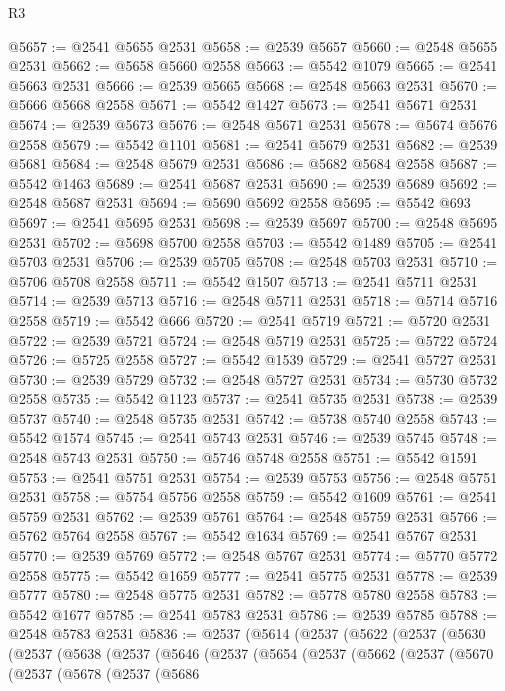 \begin{lexlean}{R3}
\begin{coremodule}
@5657 := @2541 @5655 @2531
@5658 := @2539 @5657
@5660 := @2548 @5655 @2531
@5662 := @5658 @5660 @2558
@5663 := @5542 @1079
@5665 := @2541 @5663 @2531
@5666 := @2539 @5665
@5668 := @2548 @5663 @2531
@5670 := @5666 @5668 @2558
@5671 := @5542 @1427
@5673 := @2541 @5671 @2531
@5674 := @2539 @5673
@5676 := @2548 @5671 @2531
@5678 := @5674 @5676 @2558
@5679 := @5542 @1101
@5681 := @2541 @5679 @2531
@5682 := @2539 @5681
@5684 := @2548 @5679 @2531
@5686 := @5682 @5684 @2558
@5687 := @5542 @1463
@5689 := @2541 @5687 @2531
@5690 := @2539 @5689
@5692 := @2548 @5687 @2531
@5694 := @5690 @5692 @2558
@5695 := @5542 @693
@5697 := @2541 @5695 @2531
@5698 := @2539 @5697
@5700 := @2548 @5695 @2531
@5702 := @5698 @5700 @2558
@5703 := @5542 @1489
@5705 := @2541 @5703 @2531
@5706 := @2539 @5705
@5708 := @2548 @5703 @2531
@5710 := @5706 @5708 @2558
@5711 := @5542 @1507
@5713 := @2541 @5711 @2531
@5714 := @2539 @5713
@5716 := @2548 @5711 @2531
@5718 := @5714 @5716 @2558
@5719 := @5542 @666
@5720 := @2541 @5719
@5721 := @5720 @2531
@5722 := @2539 @5721
@5724 := @2548 @5719 @2531
@5725 := @5722 @5724
@5726 := @5725 @2558
@5727 := @5542 @1539
@5729 := @2541 @5727 @2531
@5730 := @2539 @5729
@5732 := @2548 @5727 @2531
@5734 := @5730 @5732 @2558
@5735 := @5542 @1123
@5737 := @2541 @5735 @2531
@5738 := @2539 @5737
@5740 := @2548 @5735 @2531
@5742 := @5738 @5740 @2558
@5743 := @5542 @1574
@5745 := @2541 @5743 @2531
@5746 := @2539 @5745
@5748 := @2548 @5743 @2531
@5750 := @5746 @5748 @2558
@5751 := @5542 @1591
@5753 := @2541 @5751 @2531
@5754 := @2539 @5753
@5756 := @2548 @5751 @2531
@5758 := @5754 @5756 @2558
@5759 := @5542 @1609
@5761 := @2541 @5759 @2531
@5762 := @2539 @5761
@5764 := @2548 @5759 @2531
@5766 := @5762 @5764 @2558
@5767 := @5542 @1634
@5769 := @2541 @5767 @2531
@5770 := @2539 @5769
@5772 := @2548 @5767 @2531
@5774 := @5770 @5772 @2558
@5775 := @5542 @1659
@5777 := @2541 @5775 @2531
@5778 := @2539 @5777
@5780 := @2548 @5775 @2531
@5782 := @5778 @5780 @2558
@5783 := @5542 @1677
@5785 := @2541 @5783 @2531
@5786 := @2539 @5785
@5788 := @2548 @5783 @2531
@5836 := @2537
    (@5614
      (@2537
        (@5622
          (@2537
            (@5630
              (@2537
                (@5638
                  (@2537
                    (@5646
                      (@2537
                        (@5654
                          (@2537
                            (@5662
                              (@2537
                                (@5670
                                  (@2537
                                    (@5678
                                      (@2537
                                        (@5686

\end{coremodule}
\end{lexlean}
